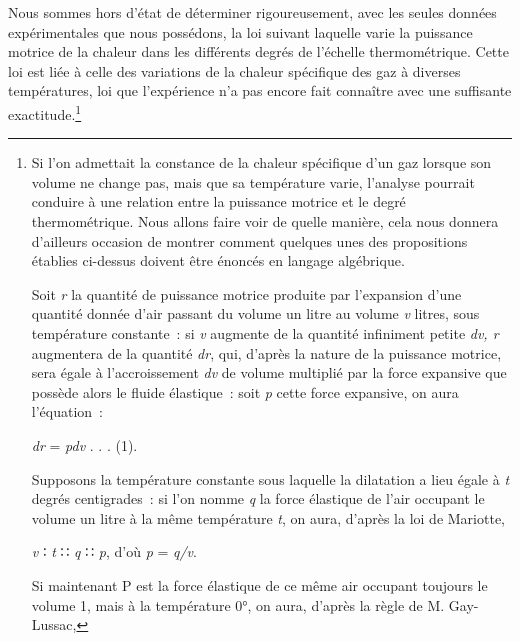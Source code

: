 \documentclass[french,twoside]{book} %
\begin{document}
Nous sommes hors d’état de déterminer rigoureusement, avec les seules données expérimentales que nous possédons, la loi suivant laquelle varie la puissance motrice de la chaleur dans les différents degrés de l’échelle thermométrique. Cette loi est liée à celle des variations de la chaleur spécifique des gaz à diverses températures, loi que l’expérience n’a pas encore fait connaître avec une suffisante exactitude.\footnote{ \noindent Si l’on admettait la constance de la chaleur spécifique d’un gaz lorsque son volume ne change pas, mais que sa température varie, l’analyse pourrait conduire à une relation entre la puissance motrice et le degré thermométrique. Nous allons faire voir de quelle manière, cela nous donnera d’ailleurs occasion de montrer comment quelques unes des propositions établies ci-dessus doivent être énoncés en langage algébrique.\par
 Soit \emph{r} la quantité de puissance motrice produite par l’expansion d’une quantité donnée d’air passant du volume un litre au volume \emph{v} litres, sous température constante : si \emph{v} augmente de la quantité infiniment petite \emph{dv, r} augmentera de la quantité \emph{dr}, qui, d’après la nature de la puissance motrice, sera égale à l’accroissement \emph{dv} de volume multiplié par la force expansive que possède alors le fluide élastique : soit \emph{p} cette force expansive, on aura l’équation :\par
 
\begin{center}
\noindent \emph{ dr} = \emph{pdv} . . . (1).\par
\end{center}

 \noindent Supposons la température constante sous laquelle la dilatation a lieu égale à \emph{t} degrés centigrades : si l’on nomme \emph{q} la force élastique de l’air occupant le volume un litre à la même température \emph{t}, on aura, d’après la loi de Mariotte,\par
 
\begin{center}
\noindent \emph{v} ∶ \emph{t} ∷ \emph{q} ∷ \emph{p}, d’où \emph{p} = \emph{q/v}.\par
\end{center}

 \noindent Si maintenant P est la force élastique de ce même air occupant toujours le volume 1, mais à la température 0°, on aura, d’après la règle de M. Gay-Lussac,\par
 
}
\end{document}
